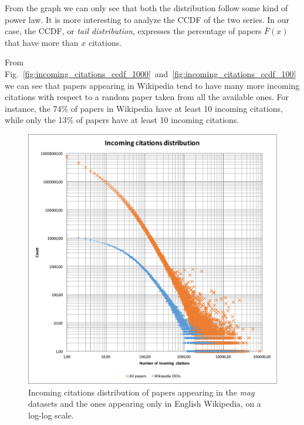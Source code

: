 From the graph we can only see that both the distribution follow some kind of power law.
It is more interesting to analyze the \ac{CCDF} of the two series.
In our case, the \ac{CCDF}, or \emph{tail distribution}, expresses the percentage of papers $\bar{F}(x)$ that have more than $x$ citations.

From Fig.~\ref{fig:incoming_citations_ccdf_1000}~and~\ref{fig:incoming_citations_ccdf_100} we can see that papers appearing in Wikipedia tend to have many more incoming citations with respect to a random paper taken from all the available ones.
For instance, the 74\% of papers in Wikipedia have at least 10 incoming citations, while only the 13\% of papers have at least 10 incoming citations.


\begin{figure}
\centering
\includegraphics[keepaspectratio=true, width=\textwidth]{assets/incoming_cits_loglog}
\caption{Incoming citations distribution of papers appearing in the \emph{mag} datasets and the ones appearing only in English Wikipedia, on a log-log scale.}
\label{fig:incoming_citations_loglog}
\end{figure}

